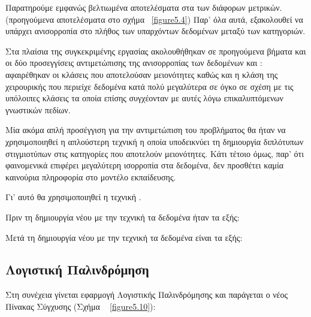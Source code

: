 Παρατηρούμε εμφανώς βελτιωμένα αποτελέσματα στα  των διάφορων μετρικών. (προηγούμενα αποτελέσματα στο σχήμα ~\ref{figure5.4})
Παρ’ όλα αυτά, εξακολουθεί να υπάρχει ανισορροπία στο πλήθος των υπαρχόντων δεδομένων μεταξύ των κατηγοριών. 

Στα πλαίσια της συγκεκριμένης εργασίας ακολουθήθηκαν σε προηγούμενα βήματα και οι δύο προσεγγίσεις αντιμετώπισης της ανισορροπίας των δεδομένων  και : αφαιρέθηκαν οι κλάσεις που αποτελούσαν μειονότητες καθώς και η κλάση της χειρουρικής που περιείχε δεδομένα κατά πολύ μεγαλύτερα σε όγκο σε σχέση με τις υπόλοιπες κλάσεις τα οποία επίσης συγχέονταν με αυτές λόγω επικαλυπτόμενων γνωστικών πεδίων.

Μία ακόμα απλή προσέγγιση για την αντιμετώπιση του προβλήματος θα ήταν να χρησιμοποιηθεί η απλούστερη  τεχνική η οποία υποδεικνύει τη δημιουργία διπλότυπων στιγμιοτύπων στις κατηγορίες που αποτελούν μειονότητες. Κάτι τέτοιο όμως, παρ' ότι φαινομενικά επιφέρει μεγαλύτερη ισορροπία στα δεδομένα, δεν προσθέτει καμία καινούρια πληροφορία στο μοντέλο εκπαίδευσης.

Γι' αυτό θα χρησιμοποιηθεί η τεχνική .


Πριν τη δημιουργία νέου  με την τεχνική  τα δεδομένα ήταν τα εξής:


Μετά τη δημιουργία νέου  με την τεχνική  τα δεδομένα είναι τα εξής:

\clearpage 
\subsection{Λογιστική Παλινδρόμηση }

Στη συνέχεια γίνεται εφαρμογή Λογιστικής Παλινδρόμησης και παράγεται ο νέος Πίνακας Σύγχυσης (Σχήμα ~ \ref{figure5.10}):

